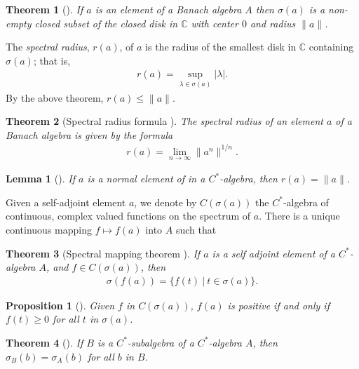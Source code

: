\documentclass[12pt,a4paper]{report}
\theoremstyle{plain}
\newtheorem*{thm*}{Theorem}
\newtheorem{lemma}{Lemma}
\newtheorem{prop}{Proposition}
\theoremstyle{definition}
\newcommand{\1}{\mathbbm{1}}
\newcommand{\C}{\mathbb{C}}
\newcommand{\spec}[1]{\sigma(#1)}
\begin{document}
\begin{thm*}[{\cite[3.2.3]{kadison83}}]
	If $a$ is an element of a Banach algebra $A$ then $\spec a$ is a non-empty closed subset of the
	closed disk in $\C$ with center $0$ and radius $\|a\|$.
\end{thm*}

The \emph{spectral radius}, $r(a)$, of $a$ is the radius of the smallest disk in $\C$ containing 
$\spec a$; that is, 
\begin{align*}
	r(a)=\sup_{\lambda\in\spec a}{|\lambda|}.
\end{align*}
By the above theorem, $r(a)\leq\|a\|$. 

\begin{thm*}[Spectral radius formula {\cite[3.3.3]{kadison83}}]
	The spectral radius of an element $a$ of a Banach algebra is given by the formula
	\begin{align*}
		r(a)= \lim_{n\to\infty} \|a^n\|^{1/n}.
	\end{align*}
\end{thm*}

\begin{lemma}[{\cite[4.1.1(i)]{kadison83}}]
	If $a$ is a normal element of in a $C^\ast$-algebra, then $r(a)=\|a\|$.
\end{lemma}

Given a self-adjoint element $a$, we denote by $C(\spec a)$ the $C^\ast$-algebra of continuous, complex valued 
functions on the spectrum of $a$. There is a unique continuous mapping $f\mapsto f(a)$ into $A$ such 
that 
\begin{thm*}[Spectral mapping theorem {\cite[4.1.6]{kadison83}}]
	If $a$ is a self adjoint element of a $C^\ast$-algebra $A$, and $f\in C(\spec a)$, then
	\begin{align*}
		\spec{f(a)} = \{f(t) ~|~ t \in \spec a\}.
	\end{align*}
\end{thm*}

\begin{prop}[{\cite[4.2.3(i)]{kadison83}}]\label{prop:423}
	Given $f$ in $C(\spec a)$, $f(a)$ is positive if and only if $f(t)\geq0$ for all $t$ in $\spec a$.
\end{prop}

\begin{thm*}[{\cite[4.1.5]{kadison83}}]
	If $B$ is a $C^\ast$-subalgebra of a $C^\ast$-algebra $A$, then $\sigma_B(b) =\sigma_A(b)$ for all 
	$b$ in $B$.
\end{thm*}
\end{document}
